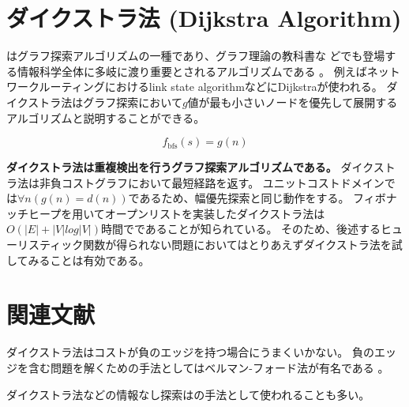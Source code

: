 \section{ダイクストラ法 (Dijkstra Algorithm)}
\label{sec:dijkstra}

はグラフ探索アルゴリズムの一種であり、グラフ理論の教科書な
どでも登場する情報科学全体に多岐に渡り重要とされるアルゴリズムである \cite{dijkstra1959note}。
例えばネットワークルーティングにおけるlink state algorithmなどにDijkstraが使われる\cite{mcquillan1980new}。
ダイクストラ法はグラフ探索において$g$値が最も小さいノードを優先して展開するアルゴリズムと説明することができる。

\begin{equation}
  f_{\text{bfs}}(s) = g(n)
\end{equation}

{\bf ダイクストラ法は重複検出を行うグラフ探索アルゴリズムである。}
ダイクストラ法は非負コストグラフにおいて最短経路を返す。
ユニットコストドメインでは$\forall n (g(n) = d(n))$であるため、幅優先探索と同じ動作をする。
フィボナッチヒープを用いてオープンリストを実装したダイクストラ法は$O(|E| + |V|log|V|)$時間でであることが知られている\cite{fredman1987fibonacci}。
そのため、後述するヒューリスティック関数が得られない問題においてはとりあえずダイクストラ法を試してみることは有効である。

\section{関連文献}

ダイクストラ法はコストが負のエッジを持つ場合にうまくいかない。
負のエッジを含む問題を解くための手法としてはベルマン-フォード法が有名である \cite{bellman1958routing,ford1956network}。


ダイクストラ法などの情報なし探索はの手法として使われることも多い\cite{tarjan1983data}。

